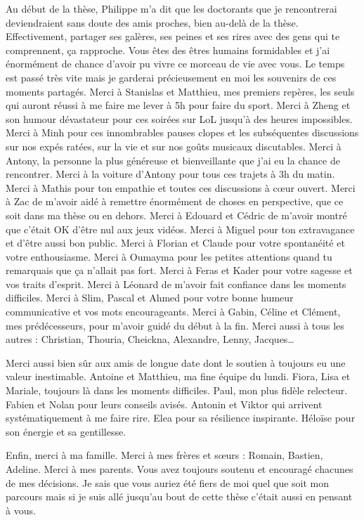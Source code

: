 \documentclass[french,a4paper,11pt,twoside]{StyleThese}
\begin{document}
Au début de la thèse, Philippe m'a dit que les doctorants que je rencontrerai deviendraient sans doute des amis proches, bien au-delà de la thèse. Effectivement, partager ses galères, ses peines et ses rires avec des gens qui te comprennent, ça rapproche. Vous êtes des êtres humains formidables et j'ai énormément de chance d'avoir pu vivre ce morceau de vie avec vous. Le temps est passé très vite mais je garderai précieusement en moi les souvenirs de ces moments partagés. 
Merci à Stanislas et Matthieu, mes premiers repères, les seuls qui auront réussi à me faire me lever à 5h pour faire du sport. 
Merci à Zheng et son humour dévastateur pour ces soirées sur LoL jusqu'à des heures impossibles. 
Merci à Minh pour ces innombrables pauses clopes et les subséquentes discussions sur nos expés ratées, sur la vie et sur nos goûts musicaux discutables.   
Merci à Antony, la personne la plus généreuse et bienveillante que j'ai eu la chance de rencontrer. 
Merci à la voiture d'Antony pour tous ces trajets à 3h du matin. 
Merci à Mathis pour ton empathie et toutes ces discussions à cœur ouvert.  
Merci à Zac de m'avoir aidé à remettre énormément de choses en perspective, que ce soit dans ma thèse ou en dehors. 
Merci à Edouard et Cédric de m'avoir montré que c'était OK d'être nul aux jeux vidéos.
Merci à Miguel pour ton extravagance et d'être aussi bon public.
Merci à Florian et Claude pour votre spontanéité et votre enthousiasme. 
Merci à Oumayma pour les petites attentions quand tu remarquais que ça n'allait pas fort. 
Merci à Feras et Kader pour votre sagesse et vos traits d'esprit. 
Merci à Léonard de m'avoir fait confiance dans les moments difficiles. 
Merci à Slim, Pascal et Ahmed pour votre bonne humeur communicative et vos mots encourageants. 
Merci à Gabin, Céline et Clément, mes prédécesseurs, pour m'avoir guidé du début à la fin. 
Merci aussi à tous les autres : Christian, Thouria, Cheickna, Alexandre, Lenny, Jacques\dots

Merci aussi bien sûr aux amis de longue date dont le soutien à toujours eu une valeur inestimable. Antoine et Matthieu, ma fine équipe du lundi. Fiora, Lisa et Mariale, toujours là dans les moments difficiles. Paul, mon plus fidèle relecteur. Fabien et Nolan pour leurs conseils avisés. Antonin et Viktor qui arrivent systématiquement à me faire rire. Elea pour sa résilience inspirante. Héloïse pour son énergie et sa gentillesse.

Enfin, merci à ma famille. Merci à mes frères et sœurs : Romain, Bastien, Adeline. Merci à mes parents. Vous avez toujours soutenu et encouragé chacunes de mes décisions. Je sais que vous auriez été fiers de moi quel que soit mon parcours mais si je suis allé jusqu'au bout de cette thèse c'était aussi en pensant à vous.
\end{document}

